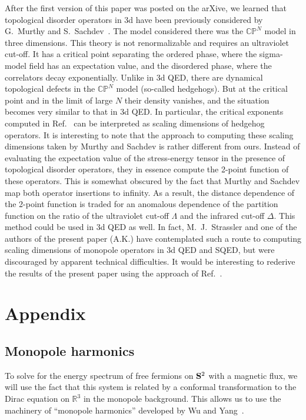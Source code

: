 \documentclass[a4paper,12pt, amsfonts, amssymb]{article}
\newcommand{\CC}{{\mathbb C}}
\newcommand{\RR}{{\mathbb R}}
\newcommand{\PP}{{\mathbb P}}
\begin{document}
After the first version of this paper was posted on the arXive, we learned that topological disorder operators in 3d have
been previously considered by G.~Murthy and S.~Sachdev~\cite{MurthySachdev}. The model considered there was the $\CC\PP^N$ model
in three dimensions. This theory is not renormalizable and requires an ultraviolet cut-off. It has a critical point 
separating the ordered phase, where the sigma-model field has an expectation value, and the disordered phase, where
the correlators decay exponentially. Unlike in 3d QED, there are dynamical topological defects in the $\CC\PP^N$ model
(so-called hedgehogs). But at the critical point and in the limit of large $N$ their density vanishes, and the situation
becomes very similar to that in 3d QED. In particular, the critical exponents computed in Ref.~\cite{MurthySachdev}
can be interpreted as scaling dimensions of hedgehog operators. It is interesting to note that the approach
to computing these scaling dimensions taken by Murthy and Sachdev is rather different from ours. Instead of evaluating
the expectation value of the stress-energy tensor in the presence of topological disorder operators, they in essence
compute the 2-point function of these operators. This is somewhat obscured by the fact that Murthy and Sachdev
map both operator insertions to infinity. As a result, the distance dependence of the 2-point function is traded for
an anomalous dependence of the partition function on the ratio of the ultraviolet cut-off $\Lambda$ and the infrared cut-off
$\Delta$. This method could be used in 3d QED as well. In fact, M.~J.~Strassler and one of the authors of the present
paper (A.K.) have contemplated such a route to computing scaling dimensions of monopole operators in 3d QED and SQED, 
but were discouraged by apparent technical difficulties. It would be interesting to rederive the results of the
present paper using the approach of Ref.~\cite{MurthySachdev}.


\section*{Appendix}


\subsection*{Monopole harmonics}

To solve for the energy spectrum of free fermions on ${\bf S}^2$ with
a magnetic flux, we will use the fact that this system is related by a conformal transformation to the Dirac equation on $\RR^3$ in the monopole background. This allows us to use the machinery of ``monopole harmonics'' developed by Wu and Yang~\cite{WY}. 
\end{document}
